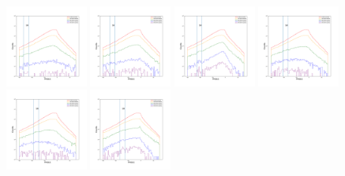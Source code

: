 \documentclass[12pt,prd]{article}
\begin{document}
\begin{figure}[h!]
\centering
\includegraphics[width=0.24\textwidth]{../figures/scanning_plotsgaiascan_l337_5_b74_4_ra201_9_dec14_0_npy_0.pdf}
\includegraphics[width=0.24\textwidth]{../figures/scanning_plotsgaiascan_l337_5_b74_4_ra201_9_dec14_0_npy_1.pdf}
\includegraphics[width=0.24\textwidth]{../figures/scanning_plotsgaiascan_l337_5_b74_4_ra201_9_dec14_0_npy_2.pdf}
\includegraphics[width=0.24\textwidth]{../figures/scanning_plotsgaiascan_l337_5_b74_4_ra201_9_dec14_0_npy_3.pdf}
\includegraphics[width=0.24\textwidth]{../figures/scanning_plotsgaiascan_l337_5_b74_4_ra201_9_dec14_0_npy_4.pdf}
\includegraphics[width=0.24\textwidth]{../figures/scanning_plotsgaiascan_l337_5_b74_4_ra201_9_dec14_0_npy_5.pdf}

\end{figure}
\end{document}
